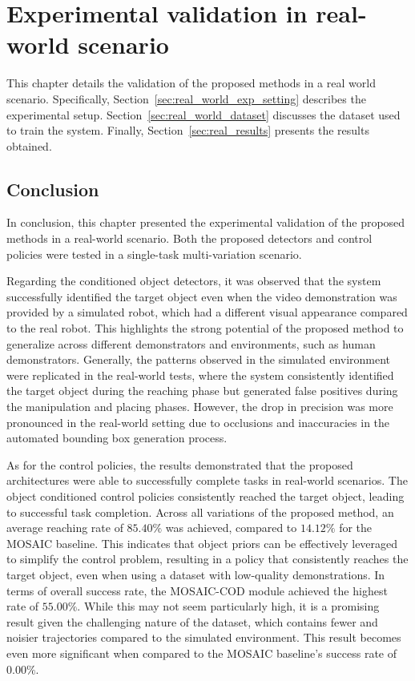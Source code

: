 \chapter{Experimental validation in real-world scenario}
\label{ch:real_world_application}
This chapter details the validation of the proposed methods in a real world scenario. Specifically, Section~\ref{sec:real_world_exp_setting} describes the experimental setup. Section~\ref{sec:real_world_dataset} discusses the dataset used to train the system. Finally, Section~\ref{sec:real_results} presents the results obtained.





\section{Conclusion}
In conclusion, this chapter presented the experimental validation of the proposed methods in a real-world scenario. Both the proposed detectors and control policies were tested in a single-task multi-variation scenario.

Regarding the conditioned object detectors, it was observed that the system successfully identified the target object even when the video demonstration was provided by a simulated robot, which had a different visual appearance compared to the real robot. This highlights the strong potential of the proposed method to generalize across different demonstrators and environments, such as human demonstrators. Generally, the patterns observed in the simulated environment were replicated in the real-world tests, where the system consistently identified the target object during the reaching phase but generated false positives during the manipulation and placing phases. However, the drop in precision was more pronounced in the real-world setting due to occlusions and inaccuracies in the automated bounding box generation process.

As for the control policies, the results demonstrated that the proposed architectures were able to successfully complete tasks in real-world scenarios. The object conditioned control policies consistently reached the target object, leading to successful task completion. Across all variations of the proposed method, an average reaching rate of $85.40\%$ was achieved, compared to $14.12\%$ for the MOSAIC baseline. This indicates that object priors can be effectively leveraged to simplify the control problem, resulting in a policy that consistently reaches the target object, even when using a dataset with low-quality demonstrations. In terms of overall success rate, the MOSAIC-COD module achieved the highest rate of $55.00\%$. While this may not seem particularly high, it is a promising result given the challenging nature of the dataset, which contains fewer and noisier trajectories compared to the simulated environment. This result becomes even more significant when compared to the MOSAIC baseline's success rate of $0.00\%$.


